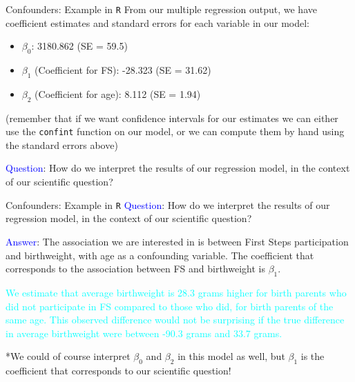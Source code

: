 \documentclass[10pt,t]{beamer}
\begin{document}
\begin{frame}{Confounders: Example in \texttt{R}}
From our multiple regression output, we have coefficient estimates and standard errors for each variable in our model:

\vspace{0.3cm}

\begin{itemize}
	\item $\beta_0$: 3180.862 (SE = 59.5)
	\item $\beta_1$ (Coefficient for FS): -28.323 (SE = 31.62)
	\item $\beta_2$ (Coefficient for age): 8.112 (SE = 1.94)
\end{itemize}

\vspace{0.3cm}
	
(remember that if we want confidence intervals for our estimates we can either use the \texttt{confint} function on our model, or we can compute them by hand using the standard errors above)

\vspace{0.3cm}

\textcolor{blue}{Question}: How do we interpret the results of our regression model, in the context of our scientific question?

	
\end{frame}

\begin{frame}{Confounders: Example in \texttt{R}}
\textcolor{blue}{Question}: How do we interpret the results of our regression model, in the context of our scientific question?

\vspace{0.3cm}

\textcolor{blue}{Answer}: The association we are interested in is between First Steps participation and birthweight, with age as a confounding variable. The coefficient that corresponds to the association between FS and birthweight is $\beta_1$.

\vspace{0.3cm}

\textcolor{cyan}{We estimate that average birthweight is 28.3 grams higher for birth parents who did not participate in FS compared to those who did, for birth parents of the same age. This observed difference would not be surprising if the true difference in average birthweight were between -90.3 grams and  33.7 grams.} \pause

\vspace{0.3cm}

*We could of course interpret $\beta_0$ and $\beta_2$ in this model as well, but $\beta_1$ is the coefficient that corresponds to our scientific question!
\end{frame}
\end{document}
